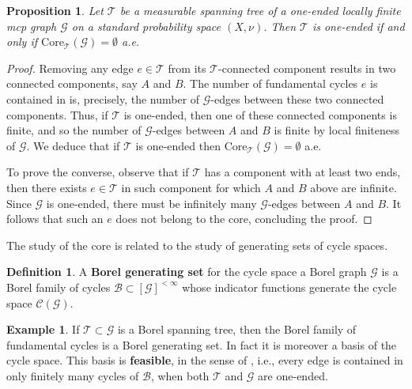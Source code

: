 \documentclass[letterpaper,11pt,reqno]{amsart}
\theoremstyle{bfnote}
\newtheorem{prop}[theorem]{Proposition}
\theoremstyle{definition}
\newtheorem{example}[theorem]{Example}
\newtheorem{definition}[theorem]{Definition}
\newcommand{\0}{\varnothing}
\numberwithin{equation}{section}
\begin{document}
\begin{prop}\label{fundamental}
    Let $\mathcal{T}$ be a measurable spanning tree of a one-ended locally finite mcp graph $\mathcal{G}$ on a standard probability space $(X,\nu)$. Then $\mathcal{T}$ is one-ended if and only if $\mathrm{Core}_\mathcal{T}(\mathcal{G})=\emptyset$ a.e.
\end{prop}

\begin{proof}
    Removing any edge $e \in \mathcal T$ from its $\mathcal T$-connected component results in two connected components, say $A$ and $B$. The number of fundamental cycles $e$ is contained in is, precisely, the number of $\mathcal G$-edges between these two connected components. Thus, if $\mathcal T$ is one-ended, then one of these connected components is finite, and so the number of $\mathcal G$-edges between $A$ and $B$ is finite by local finiteness of $\mathcal G$. We deduce that if $\mathcal T$ is one-ended then $\mathrm{Core}_\mathcal{T}(\mathcal{G})=\emptyset$ a.e.

    To prove the converse, observe that if $\mathcal T$ has a component with at least two ends, then there exists $e\in \mathcal T$ in such component for which $A$ and $B$ above are infinite. Since $\mathcal G$ is one-ended, there must be infinitely many $\mathcal G$-edges between $A$ and $B$. It follows that such an $e$ does not belong to the core, concluding the proof.
\end{proof}

The study of the core is related to the study of generating sets of cycle spaces.

\begin{definition}
    A \textbf{Borel generating set} for the cycle space a Borel graph $\mathcal{G}$ is a Borel family of cycles $\mathcal B \subset [\mathcal{G}]^{< \infty}$ whose indicator functions generate the cycle space $\mathcal C( \mathcal{G})$.
\end{definition}

\begin{example}
    If $\mathcal{T} \subset \mathcal{G}$ is a Borel spanning tree, then the Borel family of fundamental cycles is a Borel generating set. In fact it is moreover a basis of the cycle space. This basis is \textbf{feasible}, in the sense of \cite{Timar_oneended}, i.e., every edge is contained in only finitely many cycles of $\mathcal B$, when both $\mathcal T$ and $\mathcal G$ are one-ended. 
\end{example}
\end{document}
